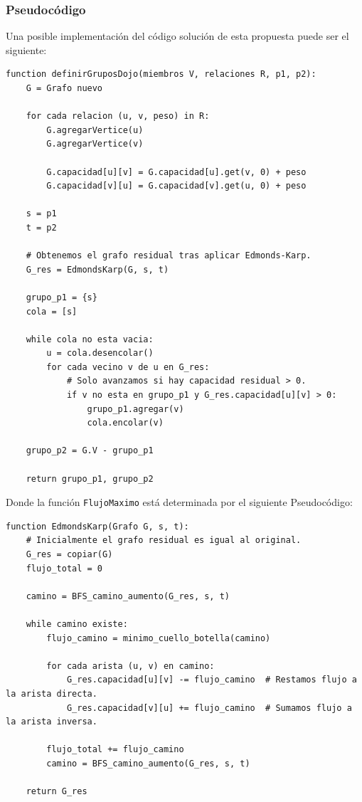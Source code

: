 \documentclass[12pt]{article}
\begin{document}
        \subsubsection{Pseudocódigo}
        
            Una posible implementación del código solución de esta propuesta puede ser el siguiente:

            \begin{lstlisting}[style=pseudo,caption={Pseudocódigo de la solución}]
function definirGruposDojo(miembros V, relaciones R, p1, p2):
    G = Grafo nuevo
    
    for cada relacion (u, v, peso) in R:
        G.agregarVertice(u)
        G.agregarVertice(v)
        
        G.capacidad[u][v] = G.capacidad[u].get(v, 0) + peso
        G.capacidad[v][u] = G.capacidad[v].get(u, 0) + peso

    s = p1
    t = p2

    # Obtenemos el grafo residual tras aplicar Edmonds-Karp.
    G_res = EdmondsKarp(G, s, t)

    grupo_p1 = {s}
    cola = [s]

    while cola no esta vacia:
        u = cola.desencolar()
        for cada vecino v de u en G_res:
            # Solo avanzamos si hay capacidad residual > 0.
            if v no esta en grupo_p1 y G_res.capacidad[u][v] > 0:
                grupo_p1.agregar(v)
                cola.encolar(v)

    grupo_p2 = G.V - grupo_p1

    return grupo_p1, grupo_p2
            \end{lstlisting}

            Donde la función \texttt{FlujoMaximo} está determinada por el siguiente Pseudocódigo: 

            \begin{lstlisting}[style=pseudo,caption={Pseudocódigo de FlujoMaximo}]
function EdmondsKarp(Grafo G, s, t):
    # Inicialmente el grafo residual es igual al original.
    G_res = copiar(G) 
    flujo_total = 0

    camino = BFS_camino_aumento(G_res, s, t)

    while camino existe:
        flujo_camino = minimo_cuello_botella(camino)

        for cada arista (u, v) en camino:
            G_res.capacidad[u][v] -= flujo_camino  # Restamos flujo a la arista directa.
            G_res.capacidad[v][u] += flujo_camino  # Sumamos flujo a la arista inversa.

        flujo_total += flujo_camino
        camino = BFS_camino_aumento(G_res, s, t)

    return G_res
            \end{lstlisting}
\end{document}
